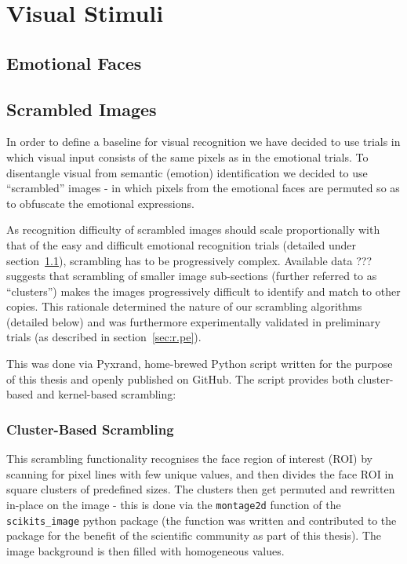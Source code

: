     \section{Visual Stimuli}
	\subsection{Emotional Faces}\label{sec:m.vs.ef}
	\subsection{Scrambled Images}\label{sec:m.vs.si}
	In order to define a baseline for visual recognition we have decided to use trials in which visual input consists of the same pixels as in the emotional trials. 
	To disentangle visual from semantic (emotion) identification we decided to use “scrambled” images - in which pixels from the emotional faces are permuted so as to obfuscate the emotional expressions.
	
	As recognition difficulty of scrambled images should scale proportionally with that of the easy and difficult emotional recognition trials (detailed under section~\ref{sec:m.vs.ef}), scrambling has to be progressively complex.
	Available data ??? suggests that scrambling of smaller image sub-sections (further referred to as “clusters”) makes the images progressively difficult to identify and match to other copies.
	This rationale determined the nature of our scrambling algorithms (detailed below) and was furthermore experimentally validated in preliminary trials (as described in section~\ref{sec:r.pe}).
	
	This was done via Pyxrand\cite{pyxrand}, home-brewed Python script written for the purpose of this thesis and openly published on GitHub.
	The script provides both cluster-based and kernel-based scrambling:
	    \subsubsection{Cluster-Based Scrambling}
	    This scrambling functionality recognises the face region of interest (ROI) by scanning for pixel lines with few unique values, and then divides the face ROI in square clusters of predefined sizes.
	    The clusters then get permuted and rewritten in-place on the image - this is done via the \colorbox{vlg}{\texttt{montage2d}} function of the \colorbox{vlg}{\texttt{scikits\_image}} python package 
	    (the function was written and contributed to the package for the benefit of the scientific community as part of this thesis).
	    The image background is then filled with homogeneous values.
